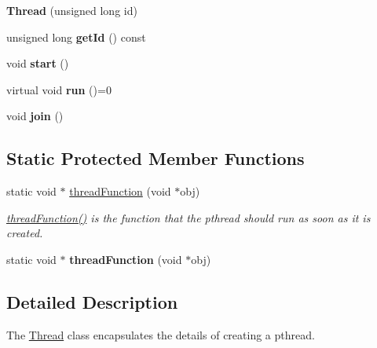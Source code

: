 \begin{DoxyCompactItemize}
\mbox{\label{class_thread_a4b0b62961ddc8eedec7be379118d0588}} 
{\bfseries Thread} (unsigned long id)
\item 
\mbox{\label{class_thread_aca302203fb0d46f6ea42bb49f689f6a6}} 
unsigned long {\bfseries get\+Id} () const
\item 
\mbox{\label{class_thread_a1f53ee62bd30a7924186ef26150ce262}} 
void {\bfseries start} ()
\item 
\mbox{\label{class_thread_aae90dfabab3e1776cf01a26e7ee3a620}} 
virtual void {\bfseries run} ()=0
\item 
\mbox{\label{class_thread_a4d9d788e98388a3217831a9046709deb}} 
void {\bfseries join} ()
\end{DoxyCompactItemize}
\subsection*{Static Protected Member Functions}
\begin{DoxyCompactItemize}
\item 
static void $\ast$ \hyperlink{class_thread_ae54fcbb9f00b8356b23795ac477f9577}{thread\+Function} (void $\ast$obj)
\begin{DoxyCompactList}\small\item\em \hyperlink{class_thread_ae54fcbb9f00b8356b23795ac477f9577}{thread\+Function()} is the function that the pthread should run as soon as it is created. \end{DoxyCompactList}\item 
\mbox{\label{class_thread_a3834aa77aae8d6da1b6eaeeed2e40937}} 
static void $\ast$ {\bfseries thread\+Function} (void $\ast$obj)
\end{DoxyCompactItemize}


\subsection{Detailed Description}
The \hyperlink{class_thread}{Thread} class encapsulates the details of creating a pthread. 

